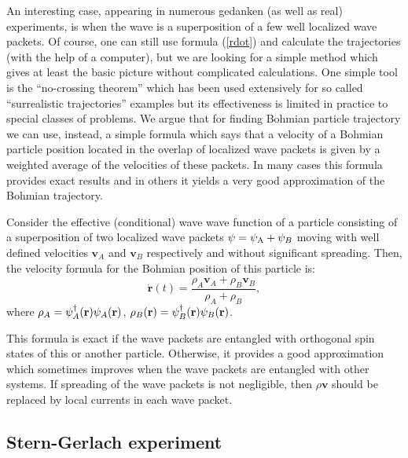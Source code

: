 \documentclass[preprint,tightenlines]{elsarticle}
\begin{document}
An interesting case, appearing in numerous gedanken (as well as real)
experiments, is when the wave is a superposition of a few well localized
wave packets. Of course, one can still use formula (\ref{rdot})
and calculate the trajectories (with the help of a computer), but we are
looking for a simple method which gives at least the basic picture
without complicated calculations. One simple tool is the ``no-crossing
theorem'' which has been used extensively for so called ``surrealistic
trajectories'' examples \cite{englert1992surrealistic} but its
effectiveness is limited in practice to special classes of problems.
We argue that for finding Bohmian particle trajectory we can use,
instead, a simple formula which says that a velocity of a Bohmian
particle position located in the overlap of localized wave packets
is given by a weighted average of the velocities of these packets.
In many cases this formula provides exact results and in others it
yields a very good approximation of the Bohmian trajectory.

Consider the effective (conditional) wave wave function of a particle
consisting of a superposition of two localized wave packets $\psi=\psi_{{\rm A}}+\psi_{B}$
moving with well defined velocities $\mathbf{v}_{A}$ and $\mathbf{v}_{B}$
respectively and without significant spreading. Then, the velocity
formula for the Bohmian position of this particle is:
 \begin{equation}
\dot{\boldsymbol{\textbf{r}}}(t)=\frac{{\rho_{A}\mathbf{v}_{A}+\rho_{B}\mathbf{v}_{B}}}{{\rho_{A}+\rho_{B}}},\label{v}
\end{equation}
 where $\rho_{A}=\psi_{A}^{\dagger}(\boldsymbol{{\rm r}})\psi_{A}(\boldsymbol{{\rm r}})$,
$\rho_{B}(\boldsymbol{{\rm r}})=\psi_{B}^{\dagger}(\boldsymbol{{\rm r}})\psi_{B}(\boldsymbol{{\rm r}})$.

This formula is exact if the wave packets are entangled with orthogonal
spin states of this or another particle. Otherwise, it provides a good
approximation which sometimes improves when the wave packets are entangled
with other systems. If spreading of the wave packets is not negligible, then $\rho\mathbf{v}$ should be replaced by local currents in each wave packet.


\subsection{ Stern-Gerlach experiment}
\end{document}
